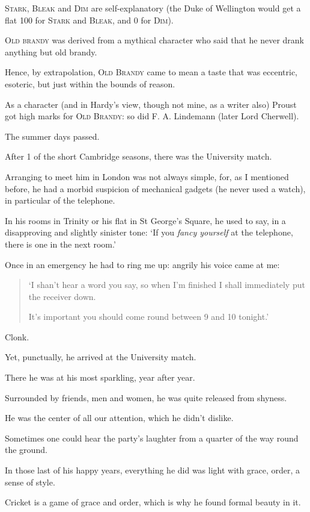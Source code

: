 \documentclass{article}
\numberwithin{equation}{section}
\begin{document}
\textsc{Stark, Bleak} and \textsc{Dim} are self-explanatory (the Duke of Wellington would get a flat 100 for \textsc{Stark} and \textsc{Bleak}, and 0 for \textsc{Dim}).

\textsc{Old brandy} was derived from a mythical character who said that he never drank anything but old brandy.

Hence, by extrapolation, \textsc{Old Brandy} came to mean a taste that was eccentric, esoteric, but just within the bounds of reason.

As a character (and in Hardy's view, though not mine, as a writer also) Proust got high marks for \textsc{Old Brandy}: so did F. A. Lindemann (later Lord Cherwell).

%
The summer days passed.

After 1 of the short Cambridge seasons, there was the University match.

Arranging to meet him in London was not always simple, for, as I mentioned before, he had a morbid suspicion of mechanical gadgets (he never used a watch), in particular of the telephone.

In his rooms in Trinity or his flat in St George's Square, he used to say, in a disapproving and slightly sinister tone: `If you \textit{fancy yourself} at the telephone, there is one in the next room.'

Once in an emergency he had to ring me up: angrily his voice came at me:
\begin{quotation}
    `I shan't hear a word you say, so when I'm finished I shall immediately put the receiver down.
    
    It's important you should come round between 9 and 10 tonight.'
\end{quotation}
Clonk.

%
Yet, punctually, he arrived at the University match.

There he was at his most sparkling, year after year.

Surrounded by friends, men and women, he was quite released from shyness.

He was the center of all our attention, which he didn't dislike.

Sometimes one could hear the party's laughter from a quarter of the way round the ground.

%
In those last of his happy years, everything he did was light with grace, order, a sense of style.

Cricket is a game of grace and order, which is why he found formal beauty in it.
\end{document}
